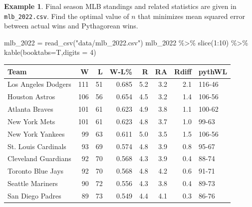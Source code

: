 \documentclass[
  11pt,
]{book}
\newenvironment{Shaded}{\begin{snugshade}}{\end{snugshade}}
\newcommand{\AttributeTok}[1]{\textcolor[rgb]{0.77,0.63,0.00}{#1}}
\newcommand{\DecValTok}[1]{\textcolor[rgb]{0.00,0.00,0.81}{#1}}
\newcommand{\FunctionTok}[1]{\textcolor[rgb]{0.00,0.00,0.00}{#1}}
\newcommand{\NormalTok}[1]{#1}
\newcommand{\OtherTok}[1]{\textcolor[rgb]{0.56,0.35,0.01}{#1}}
\newcommand{\SpecialCharTok}[1]{\textcolor[rgb]{0.00,0.00,0.00}{#1}}
\newcommand{\StringTok}[1]{\textcolor[rgb]{0.31,0.60,0.02}{#1}}
\theoremstyle{definition}
\theoremstyle{definition}
\newtheorem{example}{Example}[chapter]
\theoremstyle{definition}
\theoremstyle{definition}
\theoremstyle{remark}
\begin{document}
\newpage

\begin{example}
Final season MLB standings and related statistics are given in \texttt{mlb\_2022.csv}. Find the optimal value of \(n\) that minimizes mean squared error between actual wins and Pythagorean wins.
\end{example}

\begin{Shaded}
\begin{Highlighting}[]
\NormalTok{mlb\_2022 }\OtherTok{=} \FunctionTok{read\_csv}\NormalTok{(}\StringTok{"data/mlb\_2022.csv"}\NormalTok{)}
\NormalTok{mlb\_2022 }\SpecialCharTok{\%\textgreater{}\%} \FunctionTok{slice}\NormalTok{(}\DecValTok{1}\SpecialCharTok{:}\DecValTok{10}\NormalTok{) }\SpecialCharTok{\%\textgreater{}\%} \FunctionTok{kable}\NormalTok{(}\AttributeTok{booktabs=}\NormalTok{T,}\AttributeTok{digits =} \DecValTok{4}\NormalTok{)}
\end{Highlighting}
\end{Shaded}

\begin{tabular}{lrrrrrrl}
\toprule
Team & W & L & W-L\% & R & RA & Rdiff & pythWL\\
\midrule
Los Angeles Dodgers & 111 & 51 & 0.685 & 5.2 & 3.2 & 2.1 & 116-46\\
Houston Astros & 106 & 56 & 0.654 & 4.5 & 3.2 & 1.4 & 106-56\\
Atlanta Braves & 101 & 61 & 0.623 & 4.9 & 3.8 & 1.1 & 100-62\\
New York Mets & 101 & 61 & 0.623 & 4.8 & 3.7 & 1.0 & 99-63\\
New York Yankees & 99 & 63 & 0.611 & 5.0 & 3.5 & 1.5 & 106-56\\
\addlinespace
St. Louis Cardinals & 93 & 69 & 0.574 & 4.8 & 3.9 & 0.8 & 95-67\\
Cleveland Guardians & 92 & 70 & 0.568 & 4.3 & 3.9 & 0.4 & 88-74\\
Toronto Blue Jays & 92 & 70 & 0.568 & 4.8 & 4.2 & 0.6 & 91-71\\
Seattle Mariners & 90 & 72 & 0.556 & 4.3 & 3.8 & 0.4 & 89-73\\
San Diego Padres & 89 & 73 & 0.549 & 4.4 & 4.1 & 0.3 & 86-76\\
\bottomrule
\end{tabular}

\begin{Shaded}
\end{Shaded}
\end{document}
